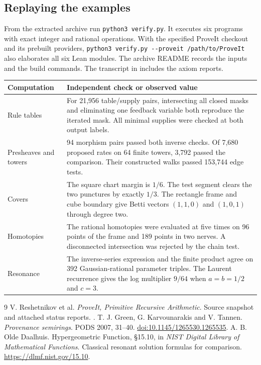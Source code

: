 \subsection{Replaying the examples}
From the extracted archive run \texttt{python3 verify.py}. It executes six programs with exact integer and rational operations. With the specified ProveIt checkout and its prebuilt providers, \texttt{python3 verify.py {-}{-}proveit /path/to/ProveIt} also elaborates all six Lean modules. The archive README records the inputs and the build commands. The transcript in  includes the axiom reports.

\begin{center}\small
\begin{tabular}{@{}p{.24\linewidth}p{.69\linewidth}@{}}
\toprule
Computation & Independent check or observed value\\
\midrule
Rule tables & For 21,956 table/supply pairs, intersecting all closed masks and eliminating one feedback variable both reproduce the iterated mask. All minimal supplies were checked at both output labels.\\[3pt]
Presheaves and towers & 94 morphism pairs passed both inverse checks. Of 7,680 proposed rates on 64 finite towers, 3,792 passed the comparison. Their constructed walks passed 153,744 edge tests.\\[3pt]
Covers & The square chart margin is $1/6$. The test segment clears the two punctures by exactly $1/3$. The rectangle frame and cube boundary give Betti vectors $(1,1,0)$ and $(1,0,1)$ through degree two.\\[3pt]
Homotopies & The rational homotopies were evaluated at five times on 96 points of the frame and 189 points in two nerves. A disconnected intersection was rejected by the chain test.\\[3pt]
Resonance & The inverse-series expression and the finite product agree on 392 Gaussian-rational parameter triples. The Laurent recurrence gives the log multiplier $9/64$ when $a=b=1/2$ and $c=3$.\\
\bottomrule
\end{tabular}
\end{center}
\begin{thebibliography}{9}
 V. Reshetnikov et al. \emph{ProveIt, Primitive Recursive Arithmetic}. Source snapshot and attached status reports. .
 T. J. Green, G. Karvounarakis and V. Tannen. \emph{Provenance semirings}. PODS 2007, 31--40. \href{https://doi.org/10.1145/1265530.1265535}{doi:10.1145/1265530.1265535}.
 A. B. Olde Daalhuis. Hypergeometric Function, \S15.10, in \emph{NIST Digital Library of Mathematical Functions}. Classical resonant solution formulas for comparison. \url{https://dlmf.nist.gov/15.10}.
\end{thebibliography}
